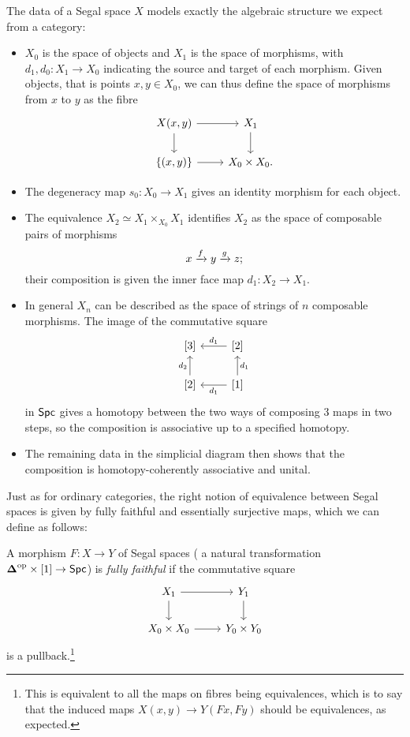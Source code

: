 \documentclass[a4paper,11pt]{article}
\begin{document}
The data of a Segal space $X$ models exactly the algebraic structure
we expect from a category:
\begin{itemize}
\item $X_{0}$ is the space of objects and $X_{1}$ is the space of
  morphisms, with $d_{1},d_{0} \colon X_{1} \to X_{0}$ indicating the
  source and target of each morphism. Given objects, that is points
  $x,y \in X_{0}$, we can thus define the space of morphisms from $x$
  to $y$ as the fibre
  \[
    \begin{tikzcd}
      X(x,y) \ar[r] \ar[d] & X_{1} \ar[d] \\
      \{(x,y)\} \ar[r] & X_{0} \times X_{0}.
    \end{tikzcd}
  \]
\item The degeneracy map $s_{0} \colon X_{0} \to X_{1}$ gives an
  identity morphism for each object.
\item The equivalence $X_{2} \simeq X_{1} \times_{X_{0}} X_{1}$
  identifies $X_{2}$ as the space of composable pairs of morphisms
  \[ x \xto{f} y \xto{g} z;\]
  their composition is given the inner face map $d_{1} \colon X_{2}
  \to X_{1}$.
\item In general $X_{n}$ can be described as the space of strings of
  $n$ composable morphisms. The image of the commutative square
  \[
    \begin{tikzcd}
      {[3]} & {[2]} \ar[l, "d_{1}"{swap}] \\
      {[2]} \ar[u, "d_{2}"]  & {[1]} \ar[l, "d_{1}"] \ar[u, "d_{1}"{swap}]
    \end{tikzcd}
  \]
  in $\textup{\textsf{Spc}}$ gives a homotopy between the two ways of composing 3 maps
  in two steps, so the composition is associative up to a specified
  homotopy.
\item The remaining data in the simplicial diagram then shows that the
  composition is homotopy-coherently associative and unital.  
\end{itemize}
Just as for ordinary categories, the right notion of equivalence
between Segal spaces is given by fully faithful and essentially
surjective maps, which we can define as follows:

\begin{defn}\label{def:ff}
  A morphism $F \colon X \to Y$ of Segal spaces (\ie{} a natural
  transformation $\Dop \times [1] \to \Spc$) is \emph{fully faithful}
  if the commutative square
  \[
    \begin{tikzcd}
      X_{1} \ar[r] \ar[d] & Y_{1} \ar[d] \\
      X_{0} \times X_{0} \ar[r] & Y_{0} \times Y_{0}
    \end{tikzcd}
  \]
  is a pullback.\footnote{This is equivalent to all the maps on fibres
    being equivalences, which is to say that the induced maps $X(x,y)
    \to Y(Fx,Fy)$ should be equivalences, as expected.}
\end{defn}
\end{document}

